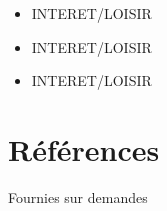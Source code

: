 \documentclass[twoside,letterpaper,11  pt]{article}
\begin{document}
\begin{flushleft}
\smallbreak

\begin{itemize}[label=\textbullet, font=  \scriptsize]
    \item INTERET/LOISIR
    \item INTERET/LOISIR 
    \item INTERET/LOISIR
\end{itemize}

\section*{Références}
\smallbreak

Fournies sur demandes

\end{flushleft}
\end{document}
